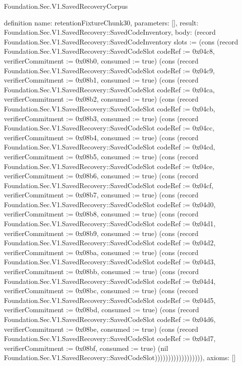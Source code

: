\begin{lexlean}{Foundation.Sec.V1.SavedRecoveryCorpus}
\begin{semanticmodule}
definition{
  name: retentionFixtureChunk30,
  parameters: [],
  result: Foundation.Sec.V1.SavedRecovery::SavedCodeInventory,
  body: (record Foundation.Sec.V1.SavedRecovery::SavedCodeInventory {slots := (cons (record Foundation.Sec.V1.SavedRecovery::SavedCodeSlot {codeRef := 0x04c8, verifierCommitment := 0x08b0, consumed := true}) (cons (record Foundation.Sec.V1.SavedRecovery::SavedCodeSlot {codeRef := 0x04c9, verifierCommitment := 0x08b1, consumed := true}) (cons (record Foundation.Sec.V1.SavedRecovery::SavedCodeSlot {codeRef := 0x04ca, verifierCommitment := 0x08b2, consumed := true}) (cons (record Foundation.Sec.V1.SavedRecovery::SavedCodeSlot {codeRef := 0x04cb, verifierCommitment := 0x08b3, consumed := true}) (cons (record Foundation.Sec.V1.SavedRecovery::SavedCodeSlot {codeRef := 0x04cc, verifierCommitment := 0x08b4, consumed := true}) (cons (record Foundation.Sec.V1.SavedRecovery::SavedCodeSlot {codeRef := 0x04cd, verifierCommitment := 0x08b5, consumed := true}) (cons (record Foundation.Sec.V1.SavedRecovery::SavedCodeSlot {codeRef := 0x04ce, verifierCommitment := 0x08b6, consumed := true}) (cons (record Foundation.Sec.V1.SavedRecovery::SavedCodeSlot {codeRef := 0x04cf, verifierCommitment := 0x08b7, consumed := true}) (cons (record Foundation.Sec.V1.SavedRecovery::SavedCodeSlot {codeRef := 0x04d0, verifierCommitment := 0x08b8, consumed := true}) (cons (record Foundation.Sec.V1.SavedRecovery::SavedCodeSlot {codeRef := 0x04d1, verifierCommitment := 0x08b9, consumed := true}) (cons (record Foundation.Sec.V1.SavedRecovery::SavedCodeSlot {codeRef := 0x04d2, verifierCommitment := 0x08ba, consumed := true}) (cons (record Foundation.Sec.V1.SavedRecovery::SavedCodeSlot {codeRef := 0x04d3, verifierCommitment := 0x08bb, consumed := true}) (cons (record Foundation.Sec.V1.SavedRecovery::SavedCodeSlot {codeRef := 0x04d4, verifierCommitment := 0x08bc, consumed := true}) (cons (record Foundation.Sec.V1.SavedRecovery::SavedCodeSlot {codeRef := 0x04d5, verifierCommitment := 0x08bd, consumed := true}) (cons (record Foundation.Sec.V1.SavedRecovery::SavedCodeSlot {codeRef := 0x04d6, verifierCommitment := 0x08be, consumed := true}) (cons (record Foundation.Sec.V1.SavedRecovery::SavedCodeSlot {codeRef := 0x04d7, verifierCommitment := 0x08bf, consumed := true}) (nil Foundation.Sec.V1.SavedRecovery::SavedCodeSlot)))))))))))))))))}),
  axioms: []
}


\end{semanticmodule}
\end{lexlean}
